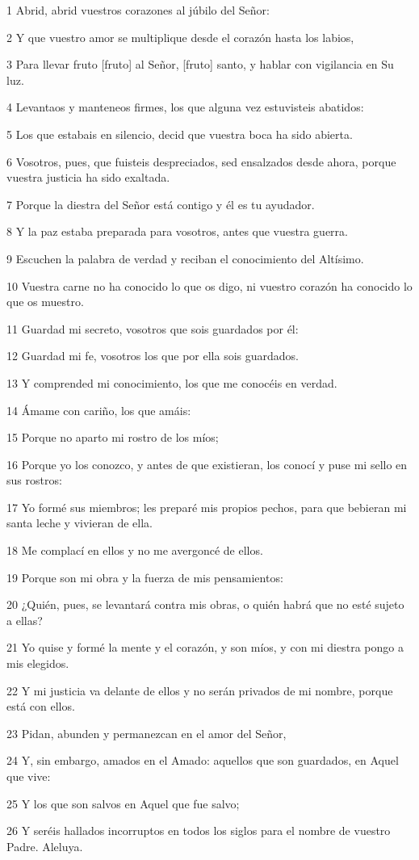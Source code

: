 \par 1 Abrid, abrid vuestros corazones al júbilo del Señor:
\par 2 Y que vuestro amor se multiplique desde el corazón hasta los labios,
\par 3 Para llevar fruto [fruto] al Señor, [fruto] santo, y hablar con vigilancia en Su luz.
\par 4 Levantaos y manteneos firmes, los que alguna vez estuvisteis abatidos:
\par 5 Los que estabais en silencio, decid que vuestra boca ha sido abierta.
\par 6 Vosotros, pues, que fuisteis despreciados, sed ensalzados desde ahora, porque vuestra justicia ha sido exaltada.
\par 7 Porque la diestra del Señor está contigo y él es tu ayudador.
\par 8 Y la paz estaba preparada para vosotros, antes que vuestra guerra.
\par 9 Escuchen la palabra de verdad y reciban el conocimiento del Altísimo.
\par 10 Vuestra carne no ha conocido lo que os digo, ni vuestro corazón ha conocido lo que os muestro.
\par 11 Guardad mi secreto, vosotros que sois guardados por él:
\par 12 Guardad mi fe, vosotros los que por ella sois guardados.
\par 13 Y comprended mi conocimiento, los que me conocéis en verdad.
\par 14 Ámame con cariño, los que amáis:
\par 15 Porque no aparto mi rostro de los míos;
\par 16 Porque yo los conozco, y antes de que existieran, los conocí y puse mi sello en sus rostros:
\par 17 Yo formé sus miembros; les preparé mis propios pechos, para que bebieran mi santa leche y vivieran de ella.
\par 18 Me complací en ellos y no me avergoncé de ellos.
\par 19 Porque son mi obra y la fuerza de mis pensamientos:
\par 20 ¿Quién, pues, se levantará contra mis obras, o quién habrá que no esté sujeto a ellas?
\par 21 Yo quise y formé la mente y el corazón, y son míos, y con mi diestra pongo a mis elegidos.
\par 22 Y mi justicia va delante de ellos y no serán privados de mi nombre, porque está con ellos.
\par 23 Pidan, abunden y permanezcan en el amor del Señor,
\par 24 Y, sin embargo, amados en el Amado: aquellos que son guardados, en Aquel que vive:
\par 25 Y los que son salvos en Aquel que fue salvo;
\par 26 Y seréis hallados incorruptos en todos los siglos para el nombre de vuestro Padre. Aleluya.

